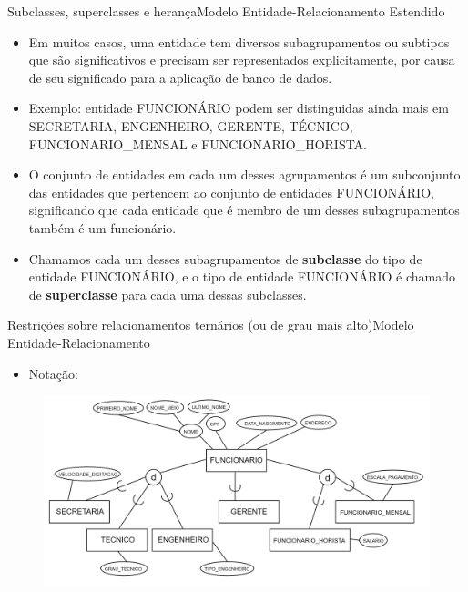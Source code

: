 \documentclass[t]{beamer}
\begin{document}

\begin{ftst}{Subclasses, superclasses e herança}{Modelo Entidade-Relacionamento Estendido}
\small
\begin{itemize}
    \item Em muitos casos, uma entidade tem diversos subagrupamentos ou subtipos que são significativos e precisam ser representados explicitamente, por causa de seu significado para a aplicação de banco de dados.
    \item Exemplo: entidade FUNCIONÁRIO podem ser distinguidas ainda mais em SECRETARIA, ENGENHEIRO, GERENTE, TÉCNICO, FUNCIONARIO\_MENSAL e FUNCIONARIO\_HORISTA.
    \item O conjunto de entidades em cada um desses agrupamentos é um subconjunto das entidades que pertencem ao conjunto de entidades FUNCIONÁRIO, significando que cada entidade que é membro de um desses subagrupamentos também é um funcionário.
    \item Chamamos cada um desses subagrupamentos de \textbf{subclasse} do tipo de entidade FUNCIONÁRIO, e o tipo de entidade FUNCIONÁRIO é chamado de \textbf{superclasse} para cada uma dessas subclasses.
\end{itemize}
\end{ftst}


\begin{ftst}{Restrições sobre relacionamentos ternários
(ou de grau mais alto)}{Modelo Entidade-Relacionamento}
\begin{itemize}
    \item Notação:
\end{itemize}

\begin{figure}
    \centering
    \includegraphics[scale=0.13]{Figuras/02_1.png}
\end{figure}

\end{ftst}
\end{document}
